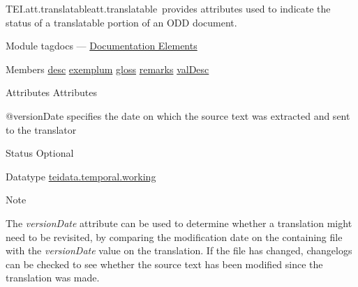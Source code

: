 \begin{reflist}
\item[]\begin{specHead}{TEI.att.translatable}{att.translatable} provides attributes used to indicate the status of a translatable portion of an ODD document.\end{specHead} 
    \item[{Module}]
  tagdocs — \hyperref[TD]{Documentation Elements}
    \item[{Members}]
  \hyperref[TEI.desc]{desc} \hyperref[TEI.exemplum]{exemplum} \hyperref[TEI.gloss]{gloss} \hyperref[TEI.remarks]{remarks} \hyperref[TEI.valDesc]{valDesc}
    \item[{Attributes}]
  Attributes\hfil\\[-10pt]\begin{sansreflist}
    \item[@versionDate]
  specifies the date on which the source text was extracted and sent to the translator
\begin{reflist}
    \item[{Status}]
  Optional
    \item[{Datatype}]
  \hyperref[TEI.teidata.temporal.working]{teidata.temporal.working}
    \item[{Note}]
  \par
The {\itshape versionDate} attribute can be used to determine whether a translation might need to be revisited, by comparing the modification date on the containing file with the {\itshape versionDate} value on the translation. If the file has changed, changelogs can be checked to see whether the source text has been modified since the translation was made.
\end{reflist}  
\end{sansreflist}  
\end{reflist}  
